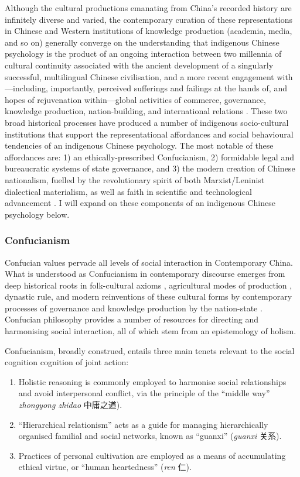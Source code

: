 \begin{CJK}{UTF8}{gbsn}
Although the cultural productions emanating from China's recorded history are infinitely diverse and varied, the contemporary curation of these representations in Chinese and Western institutions of knowledge production (academia, media, and so on) generally converge on the understanding that indigenous Chinese psychology is the product of an ongoing interaction between two millennia of cultural continuity associated with the ancient development of a singularly successful, multilingual Chinese civilisation, and a more recent engagement with---including, importantly, perceived sufferings and failings at the hands of, and hopes of rejuvenation within---global activities of commerce, governance, knowledge production, nation-building, and international relations \citep{Liu2009}.  These two broad historical processes have produced a number of indigenous socio-cultural institutions that support the representational affordances and social behavioural tendencies of an indigenous Chinese psychology.  The most notable of these affordances are: 1) an ethically-prescribed Confucianism, 2) formidable legal and bureaucratic systems of state governance, and 3) the modern creation of Chinese nationalism, fuelled by the revolutionary spirit of both Marxist/Leninist dialectical materialism, as well as faith in scientific and technological advancement \citep{Barme2009}.  I will expand on these components of an indigenous Chinese psychology below.

\subsubsection{Confucianism}
Confucian values pervade all levels of social interaction in Contemporary China. What is understood as Confucianism in contemporary discourse emerges from deep historical roots in folk-cultural axioms \citep{Wang2009}, agricultural modes of production \citep{Talhelm2014,Fei1992}, dynastic rule, and modern reinventions of these cultural forms by contemporary processes of governance and knowledge production by the nation-state \citep{Hwang1999,Liu2014}.  Confucian philosophy provides a number of resources for directing and harmonising social interaction, all of which stem from an epistemology of holism.

Confucianism, broadly construed, entails three main tenets relevant to the social cognition cognition of joint action:

\begin{enumerate}
  \item Holistic reasoning is commonly employed to harmonise social relationships and avoid interpersonal conflict, via the principle of the  ``middle way'' \textit{zhongyong zhidao} 中庸之道).
  \item ``Hierarchical relationism'' acts as a guide for managing hierarchically organised familial and social networks, known as ``guanxi'' (\textit{guanxi} 关系).
  \item Practices of personal cultivation are employed as a means of accumulating ethical virtue, or ``human heartedness'' (\textit{ren} 仁).
\end{enumerate}


\end{CJK}
